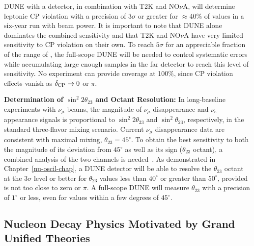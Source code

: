 DUNE with a  detector, in combination with T2K and NO$\nu$A, will
determine leptonic CP violation with a precision of $3\sigma$ or
greater for $\approx 40\%$ of \deltacp values in a 
six-year run with  beam power. It is important to note
that DUNE alone dominates the combined sensitivity and that T2K and
NO$\nu$A have very limited %
sensitivity to CP violation on their
own. To reach $5\sigma$ for an appreciable fraction of the range of
\deltacp, the full-scope %
DUNE %
will be needed to control systematic errors while
accumulating large enough samples in the far detector to reach this
level of sensitivity.  No experiment can provide coverage at 100\%,
since CP violation effects vanish as $\mdeltacp\to 0$ or $\pi$.

\textbf{\boldmath Determination of $\sin^2{2\theta_{23}}$ and Octant
  Resolution:}  In long-baseline experiments with $\nu_\mu$ beams, the
magnitude of $\nu_\mu$ disappearance and $\nu_e$ appearance signals is
proportional to $\sin^2{2\theta_{23}}$ and $\sin^2{\theta_{23}}$,
respectively, in the standard three-flavor mixing scenario.  Current
$\nu_\mu$ disappearance data are consistent with maximal mixing,
$\theta_{23} = 45^\circ$.  To obtain the best sensitivity to both the
magnitude of its deviation from $45^\circ$ as well as
its sign ($\theta_{23}$ octant), a combined analysis of the two
channels is needed~\cite{Huber:2010dx}.  As demonstrated in
Chapter~\ref{nu-oscil-chap}, a  DUNE detector will be able to resolve the
$\theta_{23}$ octant at the $3\sigma$ level or better for
$\theta_{23}$ values less than $40^\circ$ or greater than $50^\circ$,
provided \deltacp is not too close to zero or $\pi$.  A full-scope %
DUNE will measure $\theta_{23}$ with a precision of 
$1^\circ$ or less, even for values within a few degrees of $45^\circ$.


\subsection{Nucleon Decay Physics Motivated by Grand Unified Theories}

